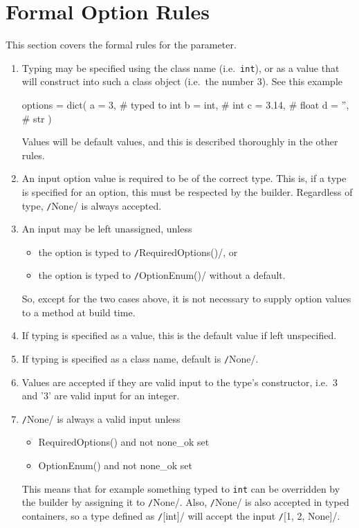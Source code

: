 \section{Formal Option Rules}
\label{sec:formal_options}
This section covers the formal rules for the \options parameter.
\begin{enumerate}

\item Typing may be specified using the class name (i.e.\ \texttt{int}), or as
  a value that will construct into such a class object (i.e.\ the
  number 3).  See this example
  \begin{python}
options = dict(
    a = 3,     # typed to int
    b = int,   #          int
    c = 3.14,  #          float
    d = '',    #          str
)
  \end{python}
  Values will be default values, and this is described thoroughly in
  the other rules.

 \item An input option value is required to be of the correct type.
   This is, if a type is specified for an option, this must be
   respected by the builder.  Regardless of type,
   \texttt/None/ is always accepted.

\item An input may be left unassigned, unless
  \begin{itemize}
  \item the option is typed to \texttt/RequiredOptions()/, or
  \item the option is typed to \texttt/OptionEnum()/ without a default.
  \end{itemize}
  So, except for the two cases above, it is not necessary to supply
  option values to a method at build time.

\item If typing is specified as a value, this is the default value if
  left unspecified.

\item If typing is specified as a class name, default is
  \texttt/None/.

\item Values are accepted if they are valid input to the type's
  constructor, i.e.\ 3 and '3' are valid input for an integer.

\item \texttt/None/ is always a valid input unless
  \begin{itemize}
  \item RequiredOptions() and not none\_ok set
  \item OptionEnum() and not none\_ok set
  \end{itemize}
  This means that for example something typed to \texttt{int} can be
  overridden by the builder by assigning it to
  \texttt/None/.  Also, \texttt/None/ is also
  accepted in typed containers, so a type defined as
  \texttt/[int]/ will accept the input
  \texttt/[1, 2, None]/.


\end{enumerate}
